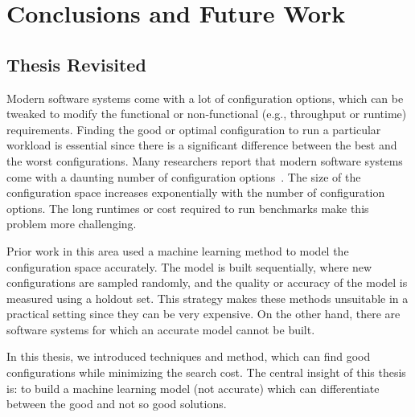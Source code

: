 \chapter{Conclusions and Future Work}
\label{chapter:conclusion}

\section{Thesis Revisited}
Modern software systems come with a lot of configuration options, which can be tweaked to modify the functional or
non-functional (e.g., throughput or runtime) requirements. Finding
the good or optimal configuration to run a particular workload is essential
since there is a significant difference between the best and the
worst configurations. Many researchers report that modern software
systems come with a daunting number of configuration options~\cite{xu2015hey}.
The size of the configuration space increases exponentially with the
number of configuration options. The long runtimes or cost required
to run benchmarks make this problem more challenging.

Prior work in this area used a machine learning method
to model the configuration space accurately. The model is built sequentially,
where new configurations are sampled randomly, and the
quality or accuracy of the model is measured using a holdout set. This strategy
makes these methods unsuitable in a practical setting since they can be very expensive. On the other hand, there are software systems for which an accurate model cannot be
built.

In this thesis, we introduced techniques and method, which can find good configurations while minimizing the search cost. The central insight of this thesis is: to build a machine learning model (not accurate) which
can differentiate between the good and not so good solutions. 

